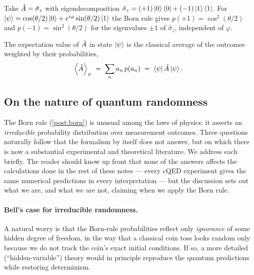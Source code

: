 \begin{example}
Take $\hat{A}=\hat\sigma_z$ with eigendecomposition
$\hat\sigma_z=(+1)\ket{0}\bra{0}+(-1)\ket{1}\bra{1}$. For
$\ket{\psi}=\cos(\theta/2)\ket{0}+e^{i\varphi}\sin(\theta/2)\ket{1}$
the Born rule gives $p(+1)=\cos^2(\theta/2)$ and
$p(-1)=\sin^2(\theta/2)$ for the eigenvalues $\pm 1$ of
$\hat\sigma_z$, independent of $\varphi$.
\end{example}

The expectation value of $\hat{A}$ in state $\ket{\psi}$ is the
classical average of the outcomes weighted by their probabilities,
\begin{equation}
\label{eq:expectation}
\expval{\hat{A}}_\psi \;=\; \sum_n a_n\,p(a_n)
\;=\; \bra{\psi}\hat{A}\ket{\psi}.
\end{equation}

\subsection{On the nature of quantum randomness}
\label{sec:quantum-randomness}

The Born rule (\cref{post:born}) is unusual among the laws of
physics: it asserts an \emph{irreducible} probability distribution
over measurement outcomes. Three questions naturally follow that
the formalism by itself does not answer, but on which there is now
a substantial experimental and theoretical literature. We address
each briefly. The reader should know up front that none of the
answers affects the calculations done in the rest of these notes
--- every cQED experiment gives the same numerical predictions in
every interpretation --- but the discussion sets out what we are,
and what we are not, claiming when we apply the Born rule.

\paragraph{Bell's case for irreducible randomness.}
A natural worry is that the Born-rule probabilities reflect only
\emph{ignorance} of some hidden degree of freedom, in the way that
a classical coin toss looks random only because we do not track the
coin's exact initial conditions. If so, a more detailed
(``hidden-variable'') theory would in principle reproduce the
quantum predictions while restoring determinism.

